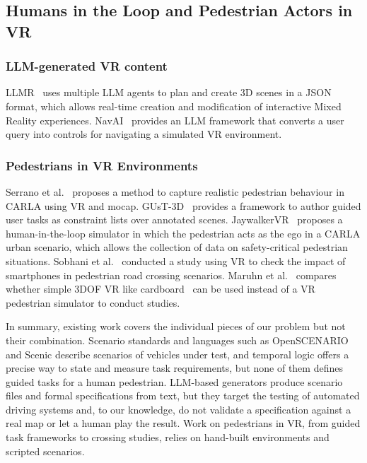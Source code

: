 \documentclass[preprint,12pt]{elsarticle}
\begin{document}
\subsection{Humans in the Loop and Pedestrian Actors in VR}

\subsubsection{LLM-generated VR content}
LLMR~\cite{delatorre2023llmr} uses multiple LLM agents to plan and create 3D scenes in a JSON format, which allows real-time creation and modification of interactive Mixed Reality experiences. NavAI~\cite{qin2026navai} provides an LLM framework that converts a user query into controls for navigating a simulated VR environment. 

\subsubsection{Pedestrians in VR Environments}
Serrano et al.~\cite{serrano2023carlavr} proposes a method to capture  realistic pedestrian behaviour in CARLA using VR and mocap. GUsT-3D~\cite{wu2022gust3d} provides a framework to author guided user tasks as constraint lists over annotated scenes. JaywalkerVR~\cite{mukoya2024jaywalkervr} proposes a human-in-the-loop simulator in which the pedestrian acts as the ego in a CARLA urban scenario, which allows the collection of data on safety-critical pedestrian situations. Sobhani et al.~\cite{sobhani2017distracted} conducted a study using VR to check the impact of smartphones in pedestrian road crossing scenarios.  Maruhn et al.~\cite{maruhn2021vrpedestrian} compares whether simple 3DOF VR like cardboard~\cite{todo} can be used instead of a VR pedestrian simulator  to conduct studies. 


In summary, existing work covers the individual pieces of our problem but not their combination. Scenario standards and languages such as OpenSCENARIO and Scenic describe scenarios of vehicles under test, and temporal logic offers a precise way to state and measure task requirements, but none of them defines guided tasks for a human pedestrian. LLM-based generators produce scenario files and formal specifications from text, but they target the testing of automated driving systems and, to our knowledge, do not validate a specification against a real map or let a human play the result. Work on pedestrians in VR, from guided task frameworks to crossing studies, relies on hand-built environments and scripted scenarios.
\end{document}
